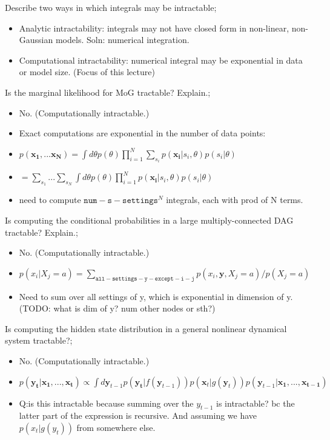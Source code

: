 \documentclass{article}
\begin{document}

Describe two ways in which integrals may be intractable; \begin{itemize} \item Analytic intractability: integrals may not have closed form in non-linear, non-Gaussian models. Soln: numerical integration.  \item Computational intractability: numerical integral may be exponential in data or model size. (Focus of this lecture) \end{itemize}

Is the marginal likelihood for MoG tractable? Explain.; \begin{itemize} \item No. (Computationally intractable.) \item Exact computations are exponential in the number of data points: \item $p(\bm{x_1, ... x_N}) = \int d\theta p(\theta)\prod_{i=1}^N\sum_{s_i}p(\bm{x_i}|s_i,\theta)p(s_i|\theta)$ \item $= \sum_{s_1}...\sum_{s_N}\int d\theta p(\theta)\prod_{i=1}^Np(\bm{x_i}|s_i,\theta)p(s_i|\theta)$ \item need to compute $\mathtt{num-s-settings}^N$ integrals, each with prod of N terms.  \end{itemize}

Is computing the conditional probabilities in a large multiply-connected DAG tractable? Explain.; \begin{itemize} \item No. (Computationally intractable.) \item $p(x_i|X_j=a)=\sum_{\mathtt{all-settings-y-except-i-j}}p(x_i, \bm{y}, X_j=a)/p(X_j=a)$ \item Need to sum over all settings of y, which is exponential in dimension of y. (TODO: what is dim of y? num other nodes or sth?) \end{itemize}

Is computing the hidden state distribution in a general nonlinear dynamical system tractable?; \begin{itemize} \item No. (Computationally intractable.) \item $p(\bm{y_t|x_1, ..., x_t})\propto \int d\bm{y}_{t-1}p(\bm{y_t}|f(\bm{y}_{t-1}))p(\bm{x}_t|g(\bm{y}_t))p(\bm{y}_{t-1}|\bm{x_1,...,x_{t-1}})$ \item Q:is this intractable because summing over the $y_{t-1}$ is intractable? bc the latter part of the expression is recursive. And assuming we have $p(x_t|g(y_t))$ from somewhere else.  \end{itemize}
\end{document}
